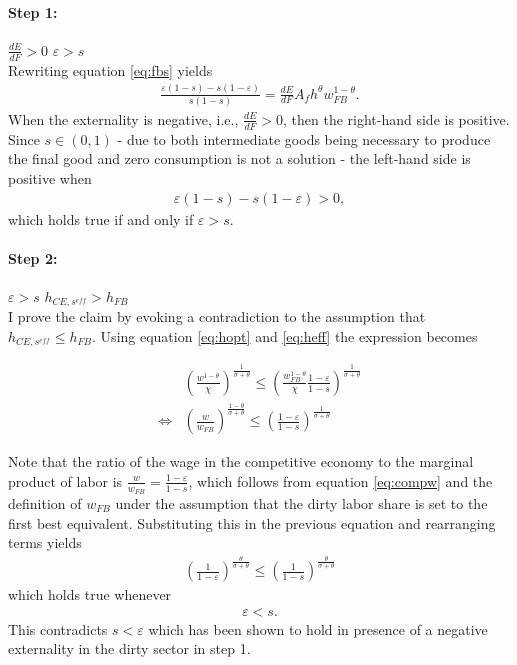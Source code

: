 \paragraph{Step 1:} $\frac{dE}{dF}>0$ \ar $\varepsilon>s$\\
Rewriting equation \ref{eq:fbs} yields
\begin{align}
\frac{\varepsilon(1-s)-s(1-\varepsilon)}{s(1-s)}=\frac{dE}{dF}A_fh^\theta w_{FB}^{1-\theta}.
\end{align}
When the externality is negative, i.e., $\frac{dE}{dF}>0$, then the right-hand side is positive.
Since $s\in(0,1)$ - due to both intermediate goods being necessary to produce the final good and zero consumption is not a solution - the left-hand side is positive when
\begin{align}
\varepsilon(1-s)-s(1-\varepsilon)>0,
\end{align}
which holds true if and only if $\varepsilon>s$.


\paragraph{Step 2:} $\varepsilon>s$ \ar $h_{CE, s^{eff}}>h_{FB}$\\
I prove the claim by evoking a contradiction to the assumption that $h_{CE, s^{eff}}\leq h_{FB}$. Using equation \ref{eq:hopt} and \ref{eq:heff} the expression becomes

\begin{align}
&\left(\frac{w^{1-\theta}}{\chi}\right)^{\frac{1}{\sigma+\theta}}\leq \left(\frac{w_{FB}^{1-\theta}}{\chi}\frac{1-\varepsilon}{1-s}\right)^\frac{1}{\sigma+\theta}
\\
\Leftrightarrow&\left(\frac{w}{w_{FB}}\right)^{\frac{1-\theta}{\sigma+\theta}}\leq \left(\frac{1-\varepsilon}{1-s}\right)^\frac{1}{\sigma+\theta}
\end{align}

Note that the ratio of the wage in the competitive economy to the marginal product of labor is $\frac{w}{w_{FB}}=\frac{1-\varepsilon}{1-s}$, which follows from equation \ref{eq:compw} and the definition of $w_{FB}$ under the assumption that the dirty labor share is set to the first best equivalent. Substituting this in the previous equation and rearranging terms yields
\begin{align}
\left(\frac{1}{1-\varepsilon}\right)^\frac{\theta}{\sigma+\theta}\leq \left(\frac{1}{1-s}\right)^\frac{\theta}{\sigma+\theta}
\end{align}
which holds true whenever
\begin{align}
\varepsilon<s.
\end{align}
This contradicts $s<\varepsilon$ which has been shown to hold in presence of a negative externality in the dirty sector in step 1. 

